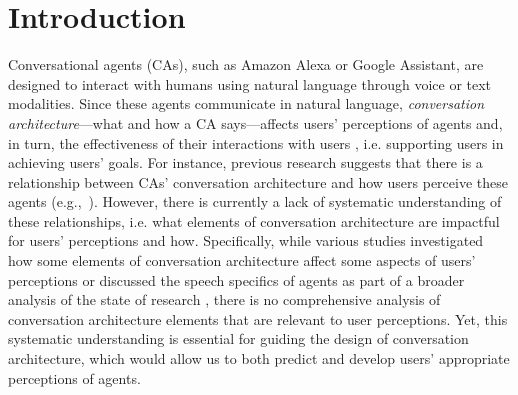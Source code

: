 
\section{Introduction}

Conversational agents (CAs), such as Amazon Alexa or Google Assistant, are designed to interact with humans using natural language through voice or text modalities. Since these agents communicate in natural language, \textit{conversation architecture}---what and how a CA says---affects users' perceptions of agents and, in turn, the effectiveness of their interactions with users \cite{knijnenburg2016inferring, seeger2021chatbots}, i.e. supporting users in achieving users' goals. For instance, previous research suggests that there is a relationship between CAs' conversation architecture and how users perceive these agents %
(e.g.,~\cite{clark2019state, feine2019taxonomy, finch2020towards}).  However, there is currently a lack of systematic understanding of these relationships, i.e. what elements of conversation architecture are impactful for users' perceptions and how. Specifically, while various studies investigated how some elements of conversation architecture affect some aspects of users' perceptions or discussed the speech specifics of agents as part of a broader analysis of the state of research \cite{clark2019state,feine2019taxonomy}, there is no comprehensive analysis of %
conversation architecture elements that are relevant to user perceptions. Yet, this systematic understanding is essential for guiding the design of conversation architecture, which would allow us to both predict and develop users' appropriate perceptions of agents.


